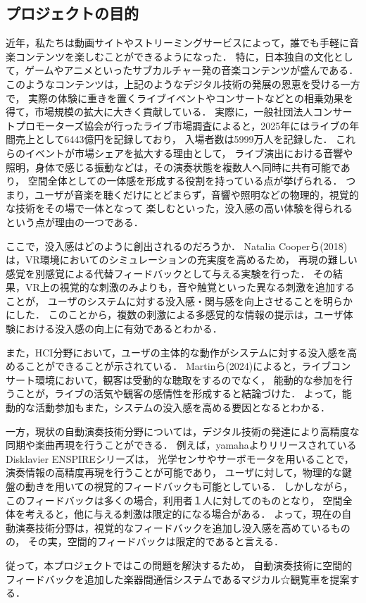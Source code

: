 \documentclass[lualatex,book,paper=a4paper,jafontsize=11.5pt,jafontscale=1.05]{jlreq}
\begin{document}
\subsection{プロジェクトの目的}
近年，私たちは動画サイトやストリーミングサービスによって，誰でも手軽に音楽コンテンツを楽しむことができるようになった．
特に，日本独自の文化として，ゲームやアニメといったサブカルチャー発の音楽コンテンツが盛んである．
このようなコンテンツは，上記のようなデジタル技術の発展の恩恵を受ける一方で，
実際の体験に重きを置くライブイベントやコンサートなどとの相乗効果を得て，市場規模の拡大に大きく貢献している\cite{cul}\cite{live}．
実際に，一般社団法人コンサートプロモーターズ協会が行ったライブ市場調査によると，2025年にはライブの年間売上として6443億円を記録しており，
入場者数は5999万人を記録した\cite{acpc}．
これらのイベントが市場シェアを拡大する理由として，
ライブ演出における音響や照明，身体で感じる振動などは，その演奏状態を複数人へ同時に共有可能であり，
空間全体としての一体感を形成する役割を持っている点が挙げられる．
つまり，ユーザが音楽を聴くだけにとどまらず，音響や照明などの物理的，視覚的な技術をその場で一体となって
楽しむといった，没入感の高い体験を得られるという点が理由の一つである．\par
ここで，没入感はどのように創出されるのだろうか．
Natalia Cooperら(2018)は，VR環境においてのシミュレーションの充実度を高めるため，
再現の難しい感覚を別感覚による代替フィードバックとして与える実験を行った．
その結果，VR上の視覚的な刺激のみよりも，音や触覚といった異なる刺激を追加することが，
ユーザのシステムに対する没入感・関与感を向上させることを明らかにした\cite{Natalia2018}．
このことから，複数の刺激による多感覚的な情報の提示は，ユーザ体験における没入感の向上に有効であるとわかる．\par
また，HCI分野において，ユーザの主体的な動作がシステムに対する没入感を高めることができることが示されている．
Martinら(2024)によると，ライブコンサート環境において，観客は受動的な聴取をするのでなく，
能動的な参加を行うことが，ライブの活気や観客の感情性を形成すると結論づけた\cite{Martin}．
よって，能動的な活動参加もまた，システムの没入感を高める要因となるとわかる．\par
一方，現状の自動演奏技術分野については，デジタル技術の発達により高精度な同期や楽曲再現を行うことができる．
例えば，yamahaよりリリースされているDisklavier ENSPIREシリーズは，
光学センサやサーボモータを用いることで，演奏情報の高精度再現を行うことが可能であり，
ユーザに対して，物理的な鍵盤の動きを用いての視覚的フィードバックも可能としている\cite{yamaha}．
しかしながら，このフィードバックは多くの場合，利用者１人に対してのものとなり，
空間全体を考えると，他に与える刺激は限定的になる場合がある．
よって，現在の自動演奏技術分野は，視覚的なフィードバックを追加し没入感を高めているものの，
その実，空間的フィードバックは限定的であると言える．\par
従って，本プロジェクトではこの問題を解決するため，
自動演奏技術に空間的フィードバックを追加した楽器間通信システムであるマジカル☆観覧車を提案する．
\end{document}
